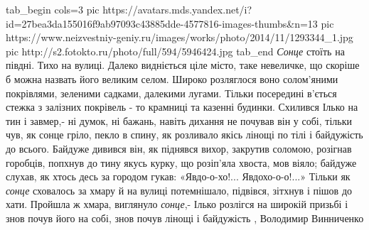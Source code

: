 \ifcmt
  tab_begin cols=3
     pic https://avatars.mds.yandex.net/i?id=27bea3da155016f9ab97093c43885dde-4577816-images-thumbs&n=13
     pic https://www.neizvestniy-geniy.ru/images/works/photo/2014/11/1293344_1.jpg
		 pic http://s2.fotokto.ru/photo/full/594/5946424.jpg
  tab_end
\fi
\emph{Сонце} стоїть на півдні. Тихо на вулиці. Далеко видніється ціле місто,
таке невеличке, що скоріше б можна назвать його великим селом. Широко
розляглося воно солом'яними покрівлями, зеленими садками, далекими лугами.
Тільки посередині в'ється стежка з залізних покрівель - то крамниці та казенні
будинки.  Схилився Ілько на тин і завмер,- ні думок, ні бажань, навіть дихання
не почував він у собі, тільки чув, як сонце гріло, пекло в спину, як розливало
якісь лінощі по тілі і байдужість до всього. Байдуже дивився він, як піднявся
вихор, закрутив соломою, розігнав горобців, попхнув до тину якусь курку, що
розіп'яла хвоста, мов віяло; байдуже слухав, як хтось десь за городом гукав:
«Явдо-о-хо!... Явдохо-о-о!...» Тільки як \emph{сонце} сховалось за хмару й на
вулиці потемнішало, підвівся, зітхнув і пішов до хати. Пройшла ж хмара,
виглянуло \emph{сонце},- Ілько розлігся на широкій призьбі і знов почув його на
собі, знов почув лінощі і байдужість
, Володимир Винниченко
